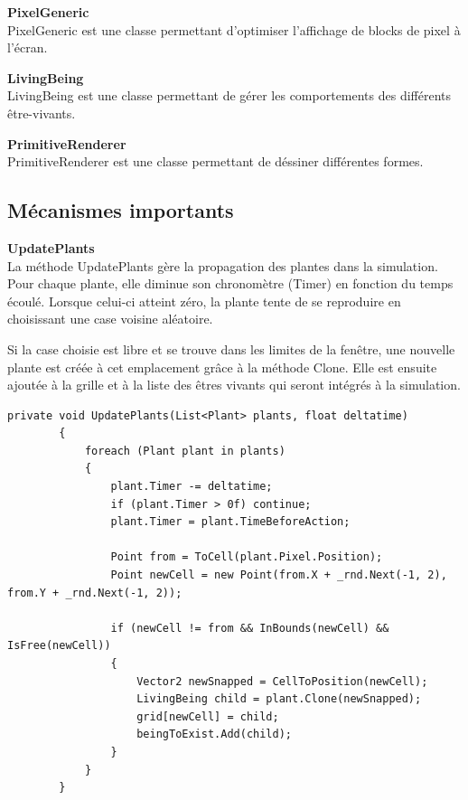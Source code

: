 \documentclass[10pt,a4paper]{article}
\begin{document}
	\textbf{PixelGeneric}\\
	PixelGeneric est une classe permettant d'optimiser l'affichage de blocks de pixel à l'écran.
	

	\textbf{LivingBeing}\\
	LivingBeing est une classe permettant de gérer les comportements des différents être-vivants.
	
	
	\textbf{PrimitiveRenderer}\\
	PrimitiveRenderer est une classe permettant de déssiner différentes formes.
	
	
	\subsection{Mécanismes importants}
	\textbf{UpdatePlants}\\
	La méthode UpdatePlants gère la propagation des plantes dans la simulation. Pour chaque plante, elle diminue son chronomètre (Timer) en fonction du temps écoulé. Lorsque celui-ci atteint zéro, la plante tente de se reproduire en choisissant une case voisine aléatoire.
	
	Si la case choisie est libre et se trouve dans les limites de la fenêtre, une nouvelle plante est créée à cet emplacement grâce à la méthode Clone. Elle est ensuite ajoutée à la grille et à la liste des êtres vivants qui seront intégrés à la simulation.
	\begin{lstlisting}[style=csharp]
		private void UpdatePlants(List<Plant> plants, float deltatime)
		{
			foreach (Plant plant in plants)
			{
				plant.Timer -= deltatime;
				if (plant.Timer > 0f) continue;
				plant.Timer = plant.TimeBeforeAction;
				
				Point from = ToCell(plant.Pixel.Position);
				Point newCell = new Point(from.X + _rnd.Next(-1, 2), from.Y + _rnd.Next(-1, 2));
				
				if (newCell != from && InBounds(newCell) && IsFree(newCell))
				{
					Vector2 newSnapped = CellToPosition(newCell);
					LivingBeing child = plant.Clone(newSnapped);
					grid[newCell] = child;
					beingToExist.Add(child);
				}
			}
		}
	\end{lstlisting}
	
\end{document}
